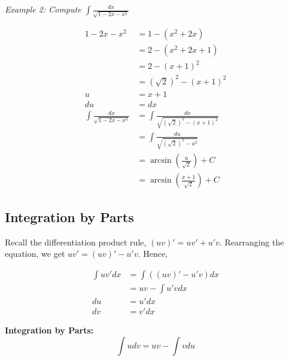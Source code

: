 \documentclass{article}
\begin{document}
            \noindent \color{blue} \textit{Example 2: Compute $\int\frac{dx}{\sqrt{1-2x-x^2}}$} \color{black}

            \begin{align*}
                1-2x-x^2                        &= 1-(x^2+2x) \\
                                                &= 2-(x^2+2x+1) \\
                                                &= 2-(x+1)^2 \\
                                                &= (\sqrt{2})^2-(x+1)^2 \\
                u                               &= x+1 \\
                du                              &= dx \\
                \int\frac{dx}{\sqrt{1-2x-x^2}}  &= \int\frac{dx}{\sqrt{(\sqrt{2})^2-(x+1)^2}} \\
                                                &= \int\frac{du}{\sqrt{(\sqrt{2})^2-u^2}} \\
                                                &= \arcsin{\left(\frac{u}{\sqrt{2}}\right)}+C \\
                                                &= \arcsin{\left(\frac{x+1}{\sqrt{2}}\right)}+C
            \end{align*}

        \subsection{Integration by Parts}
            Recall the differentiation product rule, $(uv)'=uv'+u'v$. Rearranging the equation, we
            get $uv'=(uv)'-u'v$. Hence,

            \begin{align*}
                \int uv'dx  &= \int ((uv)'-u'v)dx \\
                            &= uv - \int u'vdx \\
                du          &= u'dx \\
                dv          &= v'dx
            \end{align*}

            \noindent \color{purple} \textbf{Integration by Parts:} \color{black} \\

            \begin{equation*}
                \int udv = uv - \int v du
            \end{equation*}
\end{document}

